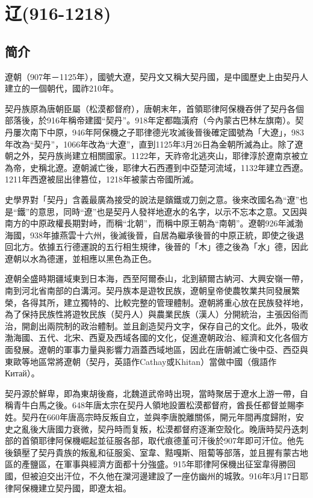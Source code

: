 
\chapter{辽\tiny(916-1218)}

\section{简介}

遼朝（907年－1125年），國號大遼，契丹文又稱大契丹國，是中國歷史上由契丹人建立的一個朝代，國祚210年。

契丹族原為唐朝臣屬（松漠都督府），唐朝末年，首領耶律阿保機吞併了契丹各個部落後，於916年稱帝建國“契丹”。918年定都臨潢府（今內蒙古巴林左旗南）。契丹屢次南下中原，946年阿保機之子耶律德光攻滅後晉後確定國號為「大遼」，983年改為“契丹”，1066年改為“大遼”，直到1125年3月26日為金朝所滅為止。除了遼朝之外，契丹族尚建立相關國家。1122年，天祚帝北逃夾山，耶律淳於遼南京被立為帝，史稱北遼。遼朝滅亡後，耶律大石西遷到中亞楚河流域，1132年建立西遼。1211年西遼被屈出律篡位，1218年被蒙古帝國所滅。

史學界對「契丹」含義最廣為接受的說法是鑌鐵或刀劍之意。後來改國名為“遼”也是“鐵”的意思，同時“遼”也是契丹人發祥地遼水的名字，以示不忘本之意。又因與南方的中原政權長期對峙，而稱“北朝”，而稱中原王朝為“南朝”。遼朝926年滅渤海國，938年據燕雲十六州，後滅後晉，自居為繼承後晉的中原正統，即使之後退回北方。依據五行德運說的五行相生規律，後晉的「木」德之後為「水」德，因此遼朝以水為德運，並相應以黑色為正色。

遼朝全盛時期疆域東到日本海，西至阿爾泰山，北到額爾古納河、大興安嶺一帶，南到河北省南部的白溝河。契丹族本是遊牧民族，遼朝皇帝使農牧業共同發展繁榮，各得其所，建立獨特的、比較完整的管理體制。遼朝將重心放在民族發祥地，為了保持民族性將遊牧民族（契丹人）與農業民族（漢人）分開統治，主張因俗而治，開創出兩院制的政治體制。並且創造契丹文字，保存自己的文化。此外，吸收渤海國、五代、北宋、西夏及西域各國的文化，促進遼朝政治、經濟和文化各個方面發展。遼朝的軍事力量與影響力涵蓋西域地區，因此在唐朝滅亡後中亞、西亞與東歐等地區常將遼朝（契丹，英語作Cathay或Khitan）當做中國（俄語作Китай）。

契丹源於鮮卑，即為東胡後裔，北魏道武帝時出現，當時聚居于遼水上游一帶，自稱青牛白馬之後。648年唐太宗在契丹人領地設置松漠都督府，酋長任都督並賜李姓。契丹在660年唐高宗時反叛自立，並與李唐脫離關係，開元年間再度歸附，安史之亂後大唐國力衰微，契丹時而复叛，松漠都督府逐漸空殼化。晚唐時契丹迭刺部的首領耶律阿保機崛起並征服各部，取代痕德堇可汗後於907年即可汗位。他先後鎮壓了契丹貴族的叛亂和征服奚、室韋、黠嘎斯、阻蔔等部落，並且握有蒙古地區的產鹽區，在軍事與經濟方面都十分強盛。915年耶律阿保機出征室韋得勝回國，但被迫交出汗位，不久他在灤河邊建設了一座仿幽州的城敦。916年3月17日耶律阿保機建立契丹國，即遼太祖。

